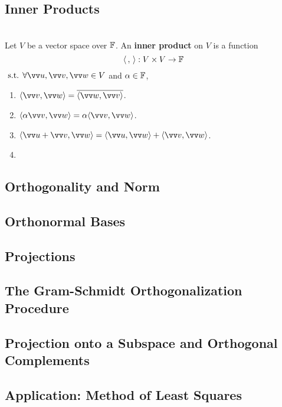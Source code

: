 \subsection{Inner Products}

\begin{definition}
    \phantom{}  \\
    Let $V$ be a vector space over ${\mathbb{F}}$. An \textbf{inner product} on $V$ is a function
    \[\langle \, , \, \rangle: V \times V \to {\mathbb{F}}\]
    $\st \forall \vvu, \vvv, \vw \in V$ and $\alpha \in {\mathbb{F}}$, 
    \begin{enumerate}
        \item $\langle \vvv, \vw \rangle = \overline{\langle \vw, \vvv \rangle}$.
        \item $\langle \alpha \vvv, \vw \rangle = \alpha \langle \vvv, \vw \rangle$.
        \item $\langle \vvu + \vvv, \vw \rangle = \langle \vvu, \vw \rangle + \langle \vvv, \vw \rangle$.
        \item 
    \end{enumerate}
\end{definition}


\subsection{Orthogonality and Norm}


\subsection{Orthonormal Bases}


\subsection{Projections}


\subsection{The Gram-Schmidt Orthogonalization Procedure}

\subsection{Projection onto a Subspace and Orthogonal Complements}


\subsection{Application: Method of Least Squares}





\newpage